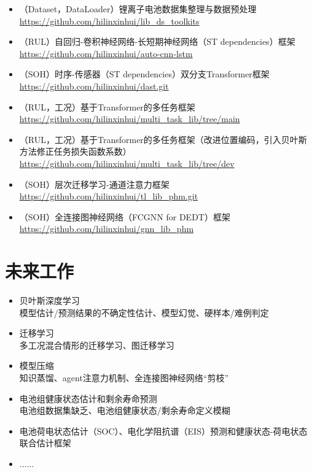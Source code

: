 \documentclass[10pt,aspectratio=43,mathserif]{beamer}
\begin{document}
\begin{frame}
  \begin{itemize}
    \item （Dataset，DataLoader）锂离子电池数据集整理与数据预处理 \\ \href{https://github.com/hilinxinhui/lib_ds_toolkits}{https://github.com/hilinxinhui/lib\_ds\_toolkits}
    \item （RUL）自回归-卷积神经网络-长短期神经网络（ST dependencies）框架 \\ \href{https://github.com/hilinxinhui/auto-cnn-lstm}{https://github.com/hilinxinhui/auto-cnn-lstm}
    \item （SOH）时序-传感器（ST dependencies）双分支Transformer框架 \\ \href{https://github.com/hilinxinhui/dast.git}{https://github.com/hilinxinhui/dast.git}
    \item （RUL，工况）基于Transformer的多任务框架 \\ \href{https://github.com/hilinxinhui/multi_task_lib/tree/main}{https://github.com/hilinxinhui/multi\_task\_lib/tree/main}
    \item （RUL，工况）基于Transformer的多任务框架（改进位置编码，引入贝叶斯方法修正任务损失函数系数） \\ \href{https://github.com/hilinxinhui/multi_task_lib/tree/dev}{https://github.com/hilinxinhui/multi\_task\_lib/tree/dev}
    \item （SOH）层次迁移学习-通道注意力框架 \\ \href{https://github.com/hilinxinhui/tl_lib_phm.git}{https://github.com/hilinxinhui/tl\_lib\_phm.git}
    \item （SOH）全连接图神经网络（FCGNN for DEDT）框架 \\ \href{https://github.com/hilinxinhui/gnn_lib_phm}{https://github.com/hilinxinhui/gnn\_lib\_phm}
  \end{itemize}
\end{frame}

\section{未来工作}

\begin{frame}
\begin{itemize}
  \item 贝叶斯深度学习 \\ 模型估计/预测结果的不确定性估计、模型幻觉、硬样本/难例判定
  \item 迁移学习 \\ 多工况混合情形的迁移学习、图迁移学习
  \item 模型压缩 \\ 知识蒸馏、agent注意力机制、全连接图神经网络“剪枝”
  \item 电池组健康状态估计和剩余寿命预测 \\ 电池组数据集缺乏、电池组健康状态/剩余寿命定义模糊
  \item 电池荷电状态估计（SOC）、电化学阻抗谱（EIS）预测和健康状态-荷电状态联合估计框架
  \item ......
\end{itemize}
\end{frame}
\end{document}
